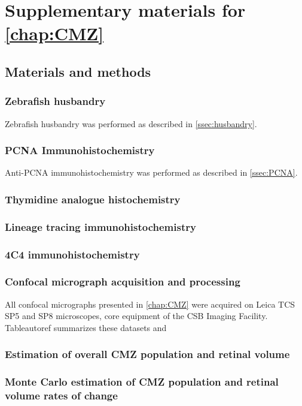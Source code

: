 \chapter{Supplementary materials for \autoref{chap:CMZ}}
\section{Materials and methods}
\subsection{Zebrafish husbandry}
Zebrafish husbandry was performed as described in \autoref{ssec:husbandry}.

\subsection{PCNA Immunohistochemistry}
Anti-PCNA immunohistochemistry was performed as described in \autoref{ssec:PCNA}.

\subsection{Thymidine analogue histochemistry}

\subsection{Lineage tracing immunohistochemistry}

\subsection{4C4 immunohistochemistry}

\subsection{Confocal micrograph acquisition and processing}
All confocal micrographs presented in \autoref{chap:CMZ} were acquired on Leica TCS SP5 and SP8 microscopes, core equipment of the CSB Imaging Facility. Tableautoref summarizes these datasets and 

\subsection{Estimation of overall CMZ population and retinal volume}

\subsection{Monte Carlo estimation of CMZ population and retinal volume rates of change}

